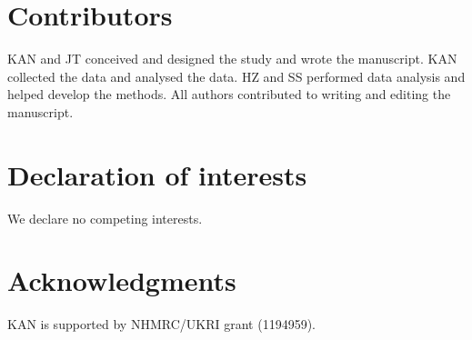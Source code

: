 \documentclass[preprint,12pt]{elsarticle}
\begin{document}






\section*{Contributors}\label{sec:credit}
KAN and JT conceived and designed the study and wrote the manuscript. KAN collected the data and analysed the data. HZ and SS performed data analysis and helped develop the methods. All authors contributed to writing and editing the manuscript.

\section*{Declaration of interests}\label{sec:dec}
We declare no competing interests.

\section*{Acknowledgments}\label{sec:ak}
KAN is supported by NHMRC/UKRI grant (1194959).


\end{document}

